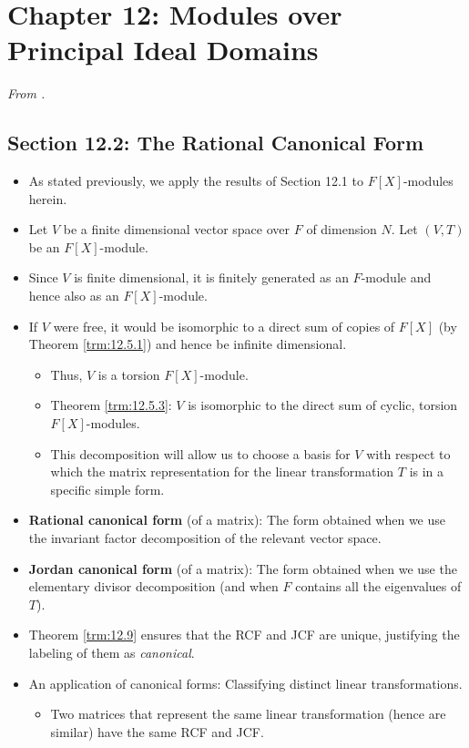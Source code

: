 \documentclass[../notes.tex]{subfiles}
\begin{document}
\section{Chapter 12: Modules over Principal Ideal Domains}
\emph{From \textcite{bib:DummitFoote}.}
\setcounter{bookch}{12}
\setcounter{proposition}{11}
\subsection*{Section 12.2: The Rational Canonical Form}
\begin{itemize}
    \item {}As stated previously, we apply the results of Section 12.1 to $F[X]$-modules herein.
    \item Let $V$ be a finite dimensional vector space over $F$ of dimension $N$. Let $(V,T)$ be an $F[X]$-module.
    \item Since $V$ is finite dimensional, it is finitely generated as an $F$-module and hence also as an $F[X]$-module.
    \item If $V$ were free, it would be isomorphic to a direct sum of copies of $F[X]$ (by Theorem \ref{trm:12.5.1}) and hence be infinite dimensional.
    \begin{itemize}
        \item Thus, $V$ is a torsion $F[X]$-module.
        \item Theorem \ref{trm:12.5.3}: $V$ is isomorphic to the direct sum of cyclic, torsion $F[X]$-modules.
        \item This decomposition will allow us to choose a basis for $V$ with respect to which the matrix representation for the linear transformation $T$ is in a specific simple form.
    \end{itemize}
    \item \textbf{Rational canonical form} (of a matrix): The form obtained when we use the invariant factor decomposition of the relevant vector space.
    \item \textbf{Jordan canonical form} (of a matrix): The form obtained when we use the elementary divisor decomposition (and when $F$ contains all the eigenvalues of $T$).
    \item Theorem \ref{trm:12.9} ensures that the RCF and JCF are unique, justifying the labeling of them as \emph{canonical}.
    \item An application of canonical forms: Classifying distinct linear transformations.
    \begin{itemize}
        \item Two matrices that represent the same linear transformation (hence are similar) have the same RCF and JCF.

\end{itemize}
\end{itemize}
\end{document}
